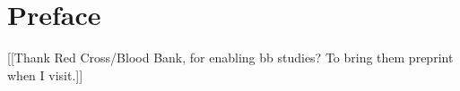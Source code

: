 \chapter{Preface}

[[Thank Red Cross/Blood Bank, for enabling bb studies? To bring them preprint when I visit.]]



